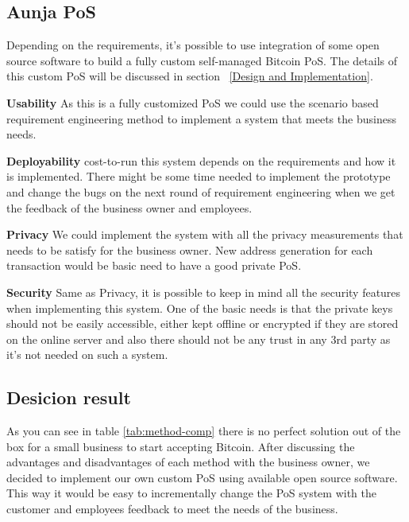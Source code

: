 \subsection{Aunja PoS}
Depending on the requirements, it's possible to use integration of some open source software to build a fully custom self-managed Bitcoin PoS. The details of this custom PoS will be discussed in section ~\ref{Design and Implementation}.

 \textbf{Usability}
As this is a fully customized PoS we could use the scenario based requirement engineering method to implement a system that meets the business needs.

 \textbf{Deployability}
cost-to-run this system depends on the requirements and how it is implemented. There might be some time needed to implement the prototype and change the bugs on the next round of requirement engineering when we get the feedback of the business owner and employees.

 \textbf{Privacy}
We could implement the system with all the privacy measurements that needs to be satisfy for the business owner. New address generation for each transaction would be basic need to have a good private PoS.

 \textbf{Security}
Same as Privacy, it is possible to keep in mind all the security features when implementing this system. One of the basic needs is that the private keys should not be easily accessible, either kept offline or encrypted if they are stored on the online server and also there should not be any trust in any 3rd party as it's not needed on such a system.

\subsection{Desicion result}
As you can see in table \ref{tab:method-comp} there is no perfect solution out of the box for a small business to start accepting Bitcoin. After discussing the advantages and disadvantages of each method with the business owner, we decided to implement our own custom PoS using available open source software. This way it would be easy to incrementally change the PoS system with the customer and employees feedback to meet the needs of the business.


